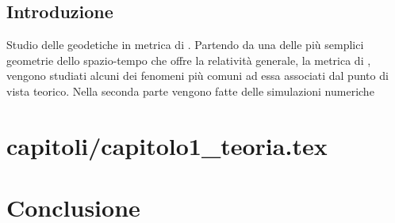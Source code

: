\documentclass[a4paper, titlepage]{book}
\begin{document}
\tableofcontents
\listoffigures
\listoftables

\newpage

\section{Introduzione}

Studio delle geodetiche in metrica di \Sh{}.
Partendo da una delle più semplici geometrie dello spazio-tempo che offre la relatività generale, la metrica di \Sh{}, vengono studiati alcuni dei fenomeni più comuni ad essa associati dal punto di vista teorico.
Nella seconda parte vengono fatte delle simulazioni numeriche

\chapter{capitoli/capitolo1_teoria.tex}


\chapter*{Conclusione}
\end{document}
